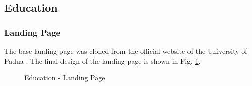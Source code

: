 \documentclass[a4paper]{article}
\begin{document}
\newpage

\subsection{Education}

\subsubsection{Landing Page}

The base landing page was cloned from the official website of the University of Padua \cite{website-unipd}. The final design of the landing page is shown in Fig. \ref{edu-landing}.

\begin{figure}[H]
	\centering
	\caption{Education - Landing Page}
	\label{edu-landing}
\end{figure}
\end{document}
